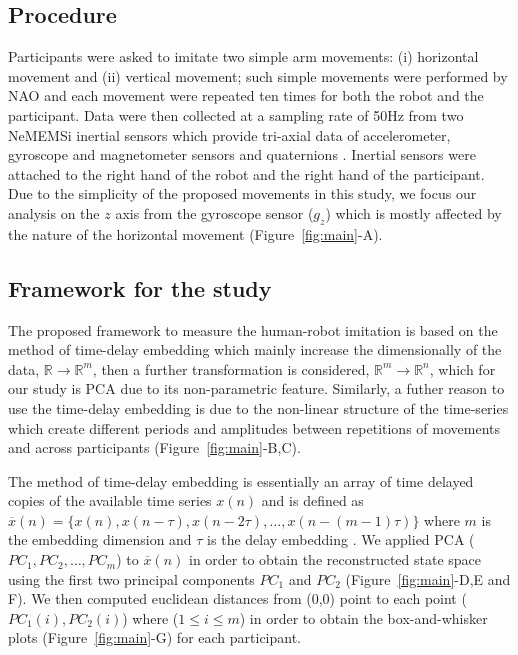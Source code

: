 \documentclass{sig-alternate-05-2015}
\begin{document}
\subsection{Procedure}
Participants were asked to imitate two simple arm movements: (i) 
horizontal movement and (ii) vertical movement;
such simple movements were performed by NAO and each movement were repeated ten times
for both the robot and the participant.
Data were then collected at a sampling rate of 50Hz from two NeMEMSi inertial sensors
which provide tri-axial data of accelerometer, gyroscope and magnetometer sensors and
quaternions \cite{Comotti2014}. Inertial sensors were attached to the right 
hand of the robot and the right hand of the participant.
Due to the simplicity of the proposed movements  in this study, 
we focus our analysis on the $z$ axis from the gyroscope sensor ($g_z$) 
which is mostly affected by the nature of the horizontal movement 
(Figure~\ref{fig:main}-A).

\subsection{Framework for the study}
The proposed framework to measure the human-robot imitation
is based on the method of time-delay embedding
which mainly increase the dimensionally of the data, 
$\mathbb{R} \rightarrow \mathbb{R}^m$,
then a further transformation is considered,
$\mathbb{R}^m \rightarrow \mathbb{R}^n$, 
which for our study is PCA due to its non-parametric feature.
Similarly, a futher reason to use the time-delay embedding
is due to the non-linear structure of the time-series 
which create different periods and amplitudes 
between repetitions of movements and across participants (Figure~\ref{fig:main}-B,C).



The method of time-delay embedding is essentially an array of 
time delayed copies of the available time series $x(n)$ and is defined as  
$ \overline{x}(n) = \{  x(n), x(n-\tau), x(n-2\tau), \dots,x(n-(m-1)\tau)\}$
where $m$ is the embedding dimension and $\tau$ is the delay embedding \cite{Huke2006}.
We applied PCA ($PC_1, PC_2, \dots, PC_m$) to $ \overline{x}(n)$
in order to obtain the reconstructed state space 
using the first two principal components $PC_1$ and $PC_2$ (Figure~\ref{fig:main}-D,E and F).
We then computed euclidean distances from (0,0) point to each 
point ($PC_1(i),PC_2(i)$) where ($1 \leq i \leq m$)
in order to obtain the box-and-whisker plots (Figure~\ref{fig:main}-G)
for each participant.
\end{document}
